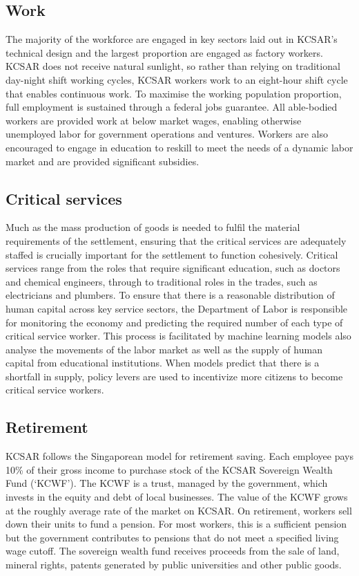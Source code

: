 \documentclass[fleqn,10pt]{Stylesheet} %
\begin{document}
\subsection{Work}
The majority of the workforce are engaged in key sectors laid out in KCSAR's technical design and the largest proportion are engaged as factory workers. KCSAR does not receive natural sunlight, so rather than relying on traditional day-night shift working cycles, KCSAR workers work to an eight-hour shift cycle that enables continuous work. To maximise the working population proportion, full employment is sustained through a federal jobs guarantee. All able-bodied workers are provided work at below market wages, enabling otherwise unemployed labor for government operations and ventures. Workers are also encouraged to engage in education to reskill to meet the needs of a dynamic labor market and are provided significant subsidies.   

\subsection{Critical services}
\label{sec:crtical_services}
Much as the mass production of goods is needed to fulfil the material requirements of the settlement, ensuring that the critical services are adequately staffed is crucially important for the settlement to function cohesively. Critical services range from the roles that require significant education, such as doctors and chemical engineers, through to traditional roles in the trades, such as electricians and plumbers. To ensure that there is a reasonable distribution of human capital across key service sectors, the Department of Labor is responsible for monitoring the economy and predicting the required number of each type of critical service worker. This process is facilitated by machine learning models also analyse the movements of the labor market as well as the supply of human capital from educational institutions. When models predict that there is a shortfall in supply, policy levers are used to incentivize more citizens to become critical service workers.

\subsection{Retirement}
KCSAR follows the Singaporean model for retirement saving. Each employee pays 10\% of their gross income to purchase stock of the KCSAR Sovereign Wealth Fund (‘KCWF’). The KCWF is a trust, managed by the government, which invests in the equity and debt of local businesses. The value of the KCWF grows at the roughly average rate of the market on KCSAR. On retirement, workers sell down their units to fund a pension. For most workers, this is a sufficient pension but the government contributes to pensions that do not meet a specified living wage cutoff. The sovereign wealth fund receives proceeds from the sale of land, mineral rights, patents generated by public universities and other public goods.
\end{document}

